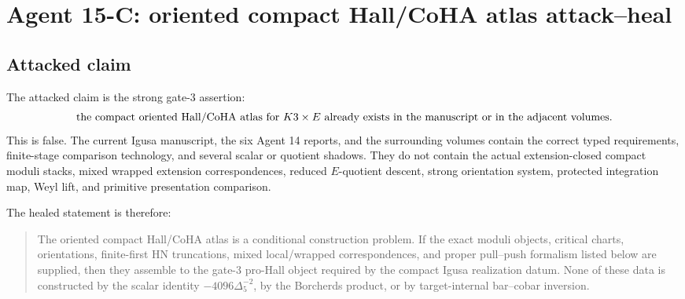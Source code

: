 \providecommand{\Z}{\mathbb Z}
\providecommand{\C}{\mathbb C}
\providecommand{\La}{\Lambda}
\providecommand{\Perf}{\operatorname{Perf}}
\providecommand{\RPerf}{\operatorname{RPerf}}
\providecommand{\Coh}{\operatorname{Coh}}
\providecommand{\RHom}{\operatorname{RHom}}
\providecommand{\Ext}{\operatorname{Ext}}
\providecommand{\sdet}{\operatorname{sdet}}
\providecommand{\Supp}{\operatorname{Supp}}
\providecommand{\Ran}{\operatorname{Ran}}
\providecommand{\CoHA}{\operatorname{CoHA}}
\providecommand{\Hall}{\mathcal H}
\providecommand{\Prim}{\operatorname{Prim}}
\providecommand{\sdim}{\operatorname{sdim}}
\providecommand{\Spch}{\mathrm{Sp}^{\mathrm{ch}}}
\providecommand{\hCS}{\mathrm{hCS}}
\providecommand{\BV}{\mathrm{BV}}
\providecommand{\TS}{\mathrm{TS}}
\providecommand{\Mot}{\mathrm{Mot}}
\providecommand{\epsor}{\epsilon_o}
\providecommand{\nuDelta}{\nu_{\Delta_5}}
\providecommand{\gDelta}{\mathfrak g_{\Delta_5}}

\section{Agent 15-C: oriented compact Hall/CoHA atlas attack--heal}
\label{sec:agent15c-oriented-compact-hall-coha-atlas}

\subsection{Attacked claim}

The attacked claim is the strong gate-3 assertion:
\[
  \hbox{the compact oriented Hall/CoHA atlas for }K3\times E
  \hbox{ already exists in the manuscript or in the adjacent volumes.}
\]
This is false.  The current Igusa manuscript, the six Agent 14 reports,
and the surrounding volumes contain the correct typed requirements,
finite-stage comparison technology, and several scalar or quotient
shadows.  They do not contain the actual extension-closed compact
moduli stacks, mixed wrapped extension correspondences, reduced
\(E\)-quotient descent, strong orientation system, protected
integration map, Weyl lift, and primitive presentation comparison.

The healed statement is therefore:

\begin{quote}
The oriented compact Hall/CoHA atlas is a conditional construction
problem.  If the exact moduli objects, critical charts, orientations,
finite-first HN truncations, mixed local/wrapped correspondences, and
proper pull--push formalism listed below are supplied, then they assemble
to the gate-3 pro-Hall object required by the compact Igusa realization
datum.  None of these data is constructed by the scalar identity
\(-4096\Delta_5^{-2}\), by the Borcherds product, or by target-internal
bar--cobar inversion.
\end{quote}

